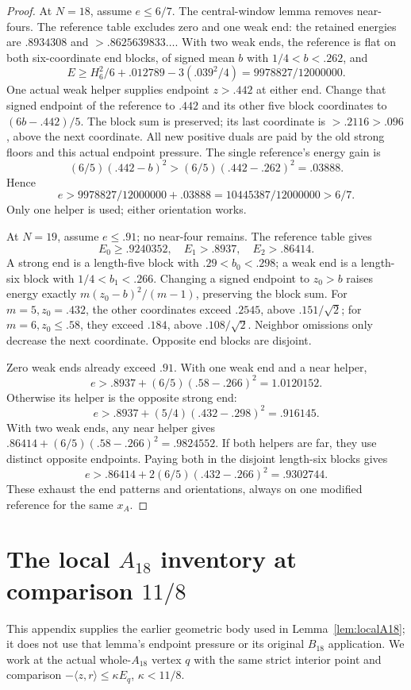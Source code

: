 \documentclass[11pt]{article}
\theoremstyle{definition}
\theoremstyle{remark}
\newcommand{\ip}[2]{\langle #1,#2\rangle}
\begin{document}
\begin{proof}
At \(N=18\), assume \(e\leq6/7\).
The central-window lemma removes near-fours.
The reference table excludes zero and one weak end:
the retained energies are \(.8934308\) and
\(>.8625639833\ldots\).
With two weak ends, the reference is flat on both
six-coordinate end blocks, of signed mean \(b\)
with \(1/4<b<.262\), and
\[
 E\geq H_6^2/6+.012789-3(.039^2/4)
      =9978827/12000000.
\]
One actual weak helper supplies endpoint \(z>.442\)
at either end. Change that signed endpoint of the
reference to \(.442\) and its other five block
coordinates to \((6b-.442)/5\).
The block sum is preserved; its last coordinate
is \(>.2116>.096\), above the next coordinate.
All new positive duals are paid by the old
strong floors and this actual endpoint pressure.
The single reference's energy gain is
\[
 (6/5)(.442-b)^2>(6/5)(.442-.262)^2=.03888.
\]
Hence
\[
 e>9978827/12000000+.03888
   =10445387/12000000>6/7.
\]
Only one helper is used; either orientation works.

At \(N=19\), assume \(e\leq.91\); no near-four
remains. The reference table gives
\[
 E_0\geq.9240352,\quad E_1>.8937,\quad E_2>.86414.
\]
A strong end is a length-five block with
\(.29<b_0<.298\); a weak end is a length-six block
with \(1/4<b_1<.266\).
Changing a signed endpoint to \(z_0>b\)
raises energy exactly \(m(z_0-b)^2/(m-1)\),
preserving the block sum.
For \(m=5,z_0=.432\), the other coordinates
exceed \(.2545\), above \(.151/\sqrt2\);
for \(m=6,z_0\leq.58\), they exceed \(.184\),
above \(.108/\sqrt2\).
Neighbor omissions only decrease the next
coordinate. Opposite end blocks are disjoint.

Zero weak ends already exceed \(.91\).
With one weak end and a near helper,
\[
 e>.8937+(6/5)(.58-.266)^2=1.0120152.
\]
Otherwise its helper is the opposite strong end:
\[
 e>.8937+(5/4)(.432-.298)^2=.916145.
\]
With two weak ends, any near helper gives
\(.86414+(6/5)(.58-.266)^2=.9824552\).
If both helpers are far, they use distinct
opposite endpoints. Paying both in the disjoint
length-six blocks gives
\[
 e>.86414+2(6/5)(.432-.266)^2=.9302744.
\]
These exhaust the end patterns and orientations,
always on one modified reference for the same \(x_A\).
\end{proof}


\section{The local \(A_{18}\) inventory at comparison \(11/8\)}
\label{app:localAinputs}
This appendix supplies the earlier geometric body used in
Lemma~\ref{lem:localA18}; it does not use that lemma's
endpoint pressure or its original \(B_{18}\) application.
We work at the actual whole-\(A_{18}\) vertex \(q\)
with the same strict interior point and comparison
\(-\ip{z}{r}\leq\kappa E_q\), \(\kappa<11/8\).
\end{document}
